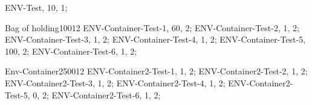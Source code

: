 


\begin{Gear}
	ENV-Test, 10, 1;
\end{Gear}

\begin{Container}[weightless = true, symbol = 1]{Bag of holding}{100}{12}
	ENV-Container-Test-1, 60, 2;
	ENV-Container-Test-2, 1, 2;
	ENV-Container-Test-3, 1, 2;
	ENV-Container-Test-4, 1, 2;
	ENV-Container-Test-5, 100, 2;
	ENV-Container-Test-6, 1, 2;
\end{Container}
\begin{Container}[symbol = 2]{Env-Container2}{500}{12}
	ENV-Container2-Test-1, 1, 2;
	ENV-Container2-Test-2, 1, 2;
	ENV-Container2-Test-3, 1, 2;
	ENV-Container2-Test-4, 1, 2;
	ENV-Container2-Test-5, 0, 2;
	ENV-Container2-Test-6, 1, 2;
\end{Container}


